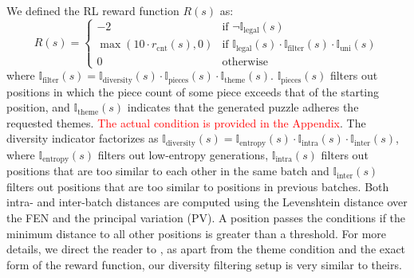 \documentclass[letterpaper]{article} %
\begin{document}
We defined the RL reward function $R(s)$ as:
\begin{equation}
    R(s) = \begin{cases}
        -2                                 & \text{if } \neg\mathbb{I}_{\text{legal}}(s)                                                                  \\
        \max(10\cdot r_{\text{cnt}}(s), 0) & \text{if } \mathbb{I}_{\text{legal}}(s) \cdot \mathbb{I}_{\text{filter}}(s) \cdot \mathbb{I}_{\text{uni}}(s) \\
        0                                  & \text{otherwise}
    \end{cases}
    \label{eq:reward function}
\end{equation}
where $\mathbb{I}_{\text{filter}}(s) = \mathbb{I}_{\text{diversity}}(s) \cdot \mathbb{I}_{\text{pieces}}(s) \cdot \mathbb{I}_{\text{theme}}(s)$. $\mathbb{I}_{\text{pieces}}(s)$ filters out positions in which the piece count of some piece exceeds that of the starting position, and $\mathbb{I}_{\text{theme}}(s)$ indicates that the generated puzzle adheres the requested themes. \textcolor{red}{The actual condition is provided in the Appendix}. The diversity indicator factorizes as $\mathbb{I}_{\text{diversity}}(s) = \mathbb{I}_{\text{entropy}}(s) \cdot \mathbb{I}_{\text{intra}}(s) \cdot \mathbb{I}_{\text{inter}}(s)$, where $\mathbb{I}_{\text{entropy}}(s)$ filters out low-entropy generations, $\mathbb{I}_{\text{intra}}(s)$ filters out positions that are too similar to each other in the same batch and $\mathbb{I}_{\text{inter}}(s)$ filters out positions that are too similar to positions in previous batches. Both intra- and inter-batch distances are computed using the Levenshtein distance \cite{li2007normalizedlevenshteindistance} over the FEN and the principal variation (PV). A position passes the conditions if the minimum distance to all other positions is greater than a threshold. For more details, we direct the reader to \cite{feng2025generatingcreativechesspuzzles}, as apart from the theme condition and the exact form of the reward function, our diversity filtering setup is very similar to theirs.
\end{document}
